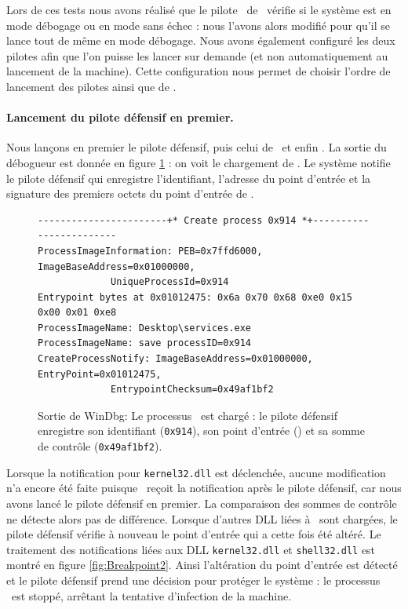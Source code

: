 Lors de ces tests nous avons réalisé que le pilote \driver\ de \duqu\ vérifie si le système est en mode débogage ou en mode sans échec : nous l'avons alors modifié pour qu'il se lance tout de même en mode débogage.
Nous avons également configuré les deux pilotes afin que l'on puisse les lancer sur demande (et non automatiquement au lancement de la machine).
Cette configuration nous permet de choisir l'ordre de lancement des pilotes ainsi que de \services.

\paragraph{Lancement du pilote défensif en premier.}
Nous lançons en premier le pilote défensif, puis celui de \duqu\ et enfin \services.
La sortie du débogueur est donnée en figure \ref{fig:Breakpoint1} : on voit le chargement de \services.
Le système notifie le pilote défensif qui enregistre l'identifiant, l'adresse du point d'entrée et la signature des premiers octets du point d'entrée de \services.

\begin{figure}[h]
\begin{center}
\scriptsize
\lstset{
  xleftmargin=.1\textwidth, xrightmargin=.1\textwidth
}
\begin{lstlisting}[language={}]
-----------------------+* Create process 0x914 *+------------------------
ProcessImageInformation: PEB=0x7ffd6000, ImageBaseAddress=0x01000000,
			 UniqueProcessId=0x914 
Entrypoint bytes at 0x01012475: 0x6a 0x70 0x68 0xe0 0x15 0x00 0x01 0xe8
ProcessImageName: Desktop\services.exe
ProcessImageName: save processID=0x914
CreateProcessNotify: ImageBaseAddress=0x01000000, EntryPoint=0x01012475,
		     EntrypointChecksum=0x49af1bf2
\end{lstlisting}
\end{center}
\caption{Sortie de WinDbg: Le processus \services\ est chargé : le pilote défensif enregistre son identifiant (\texttt{0x914}), son point d'entrée () et sa somme de contrôle (\texttt{0x49af1bf2}).\label{fig:Breakpoint1}}
\end{figure}

Lorsque la notification pour \texttt{kernel32.dll} est déclenchée, aucune modification n'a encore été faite puisque \duqu\ reçoit la notification après le pilote défensif, car nous avons lancé le pilote défensif en premier.
La comparaison des sommes de contrôle ne détecte alors pas de différence.
Lorsque d'autres DLL liées à \services\ sont chargées, le pilote défensif vérifie à nouveau le point d'entrée qui a cette fois été altéré.
Le traitement des notifications liées aux DLL \texttt{kernel32.dll} et \texttt{shell32.dll} est montré en figure \ref{fig:Breakpoint2}.
Ainsi l'altération du point d'entrée est détecté et le pilote défensif prend une décision pour protéger le système : le processus \services\ est stoppé, arrêtant la tentative d'infection de la machine.


